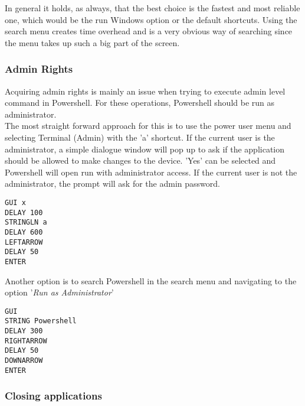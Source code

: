 In general it holds, as always, that the best choice is the fastest and most reliable one, which would be the run Windows option or the default shortcuts. Using the search menu creates time overhead and is a very obvious way of searching since the menu takes up such a big part of the screen. 

\subsubsection{Admin Rights}

Acquiring admin rights is mainly an issue when trying to execute admin level command in Powershell. For these operations, Powershell should be run as administrator. \\
The most straight forward approach for this is to use the power user menu and selecting Terminal (Admin) with the 'a' shortcut. If the current user is the administrator, a simple dialogue window will pop up to ask if the application should be allowed to make changes to the device. 'Yes' can be selected and Powershell will open run with administrator access. If the current user is not the administrator, the prompt will ask for the admin password. \\
\begin{lstlisting}[caption={Open terminal wihh admin rights via the Power User Menu}, captionpos=b]
GUI x
DELAY 100
STRINGLN a
DELAY 600
LEFTARROW
DELAY 50
ENTER
\end{lstlisting}

Another option is to search Powershell in the search menu and navigating to the option '\textit{Run as Administrator}' \\
\begin{lstlisting}[caption={Open Powershell with admin rights via Search Menu}, captionpos=b]
GUI
STRING Powershell
DELAY 300
RIGHTARROW
DELAY 50
DOWNARROW
ENTER
\end{lstlisting}

\subsubsection{Closing applications}


